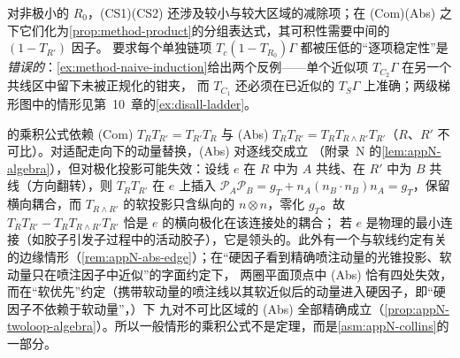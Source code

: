 对非极小的 $R_0$，(CS1)(CS2) 还涉及较小与较大区域的减除项；在 (Com)(Abs) 之下它们化为\cref{prop:method-product}的分组表达式，其可积性需要中间的 $(1-T_{R'})$ 因子。
要求每个单独链项 $T_c(1-T_{R_0})\Gamma$ 都被压低的“逐项稳定性”是\emph{错误的}：\cref{ex:method-naive-induction}给出两个反例——单个近似项 $T_{C_2}\Gamma$ 在另一个共线区中留下未被正规化的钳夹，
而 $T_{C_1}$ 还必须在已近似的 $T_S\Gamma$ 上准确；两级梯形图中的情形见第~10~章的\cref{ex:disall-ladder}。

\begin{remark}\label{rem:method-abs-failure}
的乘积公式依赖 (Com) $T_RT_{R'}=T_{R'}T_R$ 与 (Abs) $T_RT_{R'}=T_RT_{R\wedge R'}T_{R'}$（$R$、$R'$ 不可比）。对适配走向下的动量替换，(Abs) 对逐线交成立
（附录~N 的\cref{lem:appN-algebra}），但对极化投影可能失效：设线 $e$ 在 $R$ 中为 $A$ 共线、在 $R'$ 中为 $B$ 共线（方向翻转），则 $T_RT_{R'}$ 在 $e$ 上插入
$\mathcal P_A\mathcal P_B=g_T+n_A(n_B\cdot n_B)n_A=g_T$，保留横向耦合，而 $T_{R\wedge R'}$ 的软投影只含纵向的 $n\otimes n$，零化 $g_T$。故 $T_RT_{R'}-T_RT_{R\wedge R'}T_{R'}$ 恰是 $e$ 的横向极化在该连接处的耦合；
若 $e$ 是物理的最小连接（如胶子引发子过程中的活动胶子），它是领头的。此外有一个与软线约定有关的边缘情形（\cref{rem:appN-abs-edge}）；在“硬因子看到精确喷注动量的光锥投影、软动量只在喷注因子中近似”的字面约定下，
两圈平面顶点中 (Abs) 恰有四处失效，而在“软优先”约定（携带软动量的喷注线以其软近似后的动量进入硬因子，即“硬因子不依赖于软动量”，\cite[第~10.6.6~节]{Collins2011}）下
九对不可比区域的 (Abs) 全部精确成立（\cref{prop:appN-twoloop-algebra}）。所以一般情形的乘积公式不是定理，而是\cref{asm:appN-collins}的一部分。
\end{remark}
